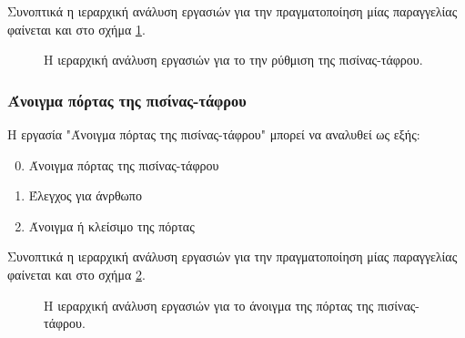 \documentclass{assignment}
\begin{document}
Συνοπτικά η ιεραρχική ανάλυση εργασιών για την πραγματοποίηση μίας παραγγελίας φαίνεται και στο σχήμα \ref{fig:task_analysis:pisina}.

\begin{figure}
\begin{center}
\caption{Η ιεραρχική ανάλυση εργασιών για το την ρύθμιση της πισίνας-τάφρου.}
\label{fig:task_analysis:pisina}
\end{center}
\end{figure}

\subsubsection{Άνοιγμα πόρτας της πισίνας-τάφρου}

Η εργασία "Άνοιγμα πόρτας της πισίνας-τάφρου" μπορεί να αναλυθεί ως εξής:

\begin{enumerate}
\setcounter{enumi}{-1}
\item Άνοιγμα πόρτας της πισίνας-τάφρου
\item Έλεγχος για άνρθωπο
\item Άνοιγμα ή κλείσιμο της πόρτας
\end{enumerate}

Συνοπτικά η ιεραρχική ανάλυση εργασιών για την πραγματοποίηση μίας παραγγελίας φαίνεται και στο σχήμα \ref{fig:task_analysis:porta}.

\begin{figure}
\begin{center}
\caption{Η ιεραρχική ανάλυση εργασιών για το άνοιγμα της πόρτας της πισίνας-τάφρου.}
\label{fig:task_analysis:porta}
\end{center}
\end{figure}
\end{document}
